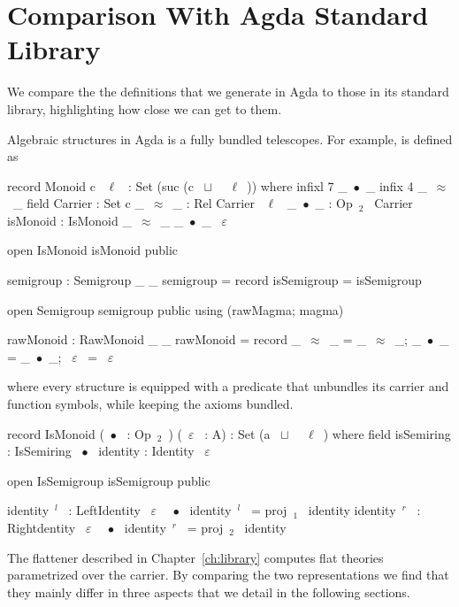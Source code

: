 \section{Comparison With Agda Standard Library}
\label{sec:compasion_agda_stdlib}
We compare the the definitions that we generate in Agda to those in its standard library, highlighting how close we can get to them. 

Algebraic structures in Agda is a fully bundled telescopes. For example,  is defined as
\begin{agdacode}
record Monoid c ~$\ell$~ : Set (suc (c ~$\sqcup$~ ~$\ell$~)) where 
  infixl 7 _~$\bullet$~_
  infix 4 _~$\approx$~_
  field 
   Carrier : Set c 
   _~$\approx$~_ : Rel Carrier ~$\ell$~ 
   _~$\bullet$~_ : Op~$_2$~ Carrier 
   isMonoid : IsMonoid _~$\approx$~_ _~$\bullet$~_ ~$\varepsilon$~ 
   
   open IsMonoid isMonoid public
   
   semigroup : Semigroup _ _
   semigroup = record { isSemigroup = isSemigroup }
   
   open Semigroup semigroup public using (rawMagma; magma)
   
   rawMonoid : RawMonoid _ _
   rawMonoid = record { _~$\approx$~_ = _~$\approx$~_; _~$\bullet$~_ = _~$\bullet$~_; ~$\varepsilon$~ = ~$\varepsilon$~}
\end{agdacode}
\noindent where every structure is equipped with a predicate that unbundles its carrier and function symbols, while keeping the axioms bundled.  
\begin{agdacode}
record IsMonoid (~$\bullet$~ : Op~$_2$~) (~$\varepsilon$~ : A) : Set (a ~$\sqcup$~ ~$\ell$~) where 
  field 
   isSemiring : IsSemiring ~$\bullet$~ 
   identity : Identity ~$\varepsilon$~
     
  open IsSemigroup isSemigroup public
     
  identity~$^l$~ : LeftIdentity ~$\varepsilon$~ ~$\bullet$~ 
  identity~$^l$~ = proj~$_1$~ identity  
  identity~$^r$~ : Rightdentity ~$\varepsilon$~ ~$\bullet$~ 
  identity~$^r$~ = proj~$_2$~ identity           
\end{agdacode}
The flattener described in Chapter~\ref{ch:library} computes flat theories parametrized over the carrier. By comparing the two representations we find that they mainly differ in three aspects that we detail in the following sections. 

